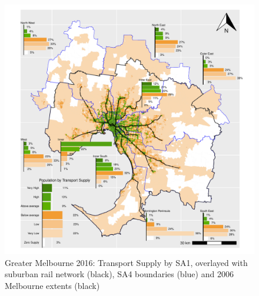 \documentclass[preprint, 3p,
authoryear]{elsarticle} %
\begin{document}
\begin{figure}
\centering
\includegraphics{ReynoldsCurrieQu2024_files/figure-latex/Greater_Melbourne_SA12016_plot_appendix-1.pdf}
\caption{Greater Melbourne 2016: Transport Supply by SA1, overlayed with
suburban rail network (black), SA4 boundaries (blue) and 2006 Melbourne
extents (black)}
\end{figure}
\end{document}
